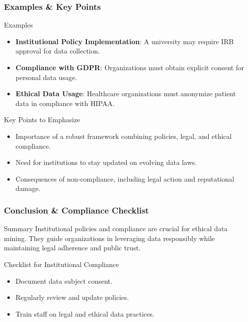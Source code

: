 \documentclass[aspectratio=169]{beamer}
\begin{document}
\begin{frame}[fragile]
    \frametitle{Examples & Key Points}
    \begin{block}{Examples}
        \begin{itemize}
            \item \textbf{Institutional Policy Implementation}: 
            A university may require IRB approval for data collection.
            
            \item \textbf{Compliance with GDPR}: 
            Organizations must obtain explicit consent for personal data usage.

            \item \textbf{Ethical Data Usage}: 
            Healthcare organizations must anonymize patient data in compliance with HIPAA.
        \end{itemize}
    \end{block}

    \begin{block}{Key Points to Emphasize}
        \begin{itemize}
            \item Importance of a robust framework combining policies, legal, and ethical compliance.
            \item Need for institutions to stay updated on evolving data laws.
            \item Consequences of non-compliance, including legal action and reputational damage.
        \end{itemize}
    \end{block}
\end{frame}

\begin{frame}[fragile]
    \frametitle{Conclusion & Compliance Checklist}
    \begin{block}{Summary}
        Institutional policies and compliance are crucial for ethical data mining. They guide organizations in leveraging data responsibly while maintaining legal adherence and public trust.
    \end{block}

    \begin{block}{Checklist for Institutional Compliance}
        \begin{itemize}
            \item Document data subject consent.
            \item Regularly review and update policies.
            \item Train staff on legal and ethical data practices.
        \end{itemize}
    \end{block}
\end{frame}
\end{document}
